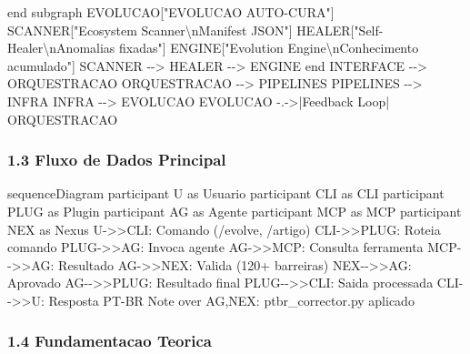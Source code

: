 \documentclass[
  12pt,
]{article}
\newenvironment{Shaded}{}{}
\newcommand{\NormalTok}[1]{#1}
\begin{document}
\begin{Shaded}
\begin{Highlighting}[]
\NormalTok{end}
\NormalTok{subgraph EVOLUCAO["EVOLUCAO AUTO{-}CURA"]}
\NormalTok{SCANNER["Ecosystem Scanner\textbackslash{}nManifest JSON"]}
\NormalTok{HEALER["Self{-}Healer\textbackslash{}nAnomalias fixadas"]}
\NormalTok{ENGINE["Evolution Engine\textbackslash{}nConhecimento acumulado"]}
\NormalTok{SCANNER {-}{-}\textgreater{} HEALER {-}{-}\textgreater{} ENGINE}
\NormalTok{end}
\NormalTok{INTERFACE {-}{-}\textgreater{} ORQUESTRACAO}
\NormalTok{ORQUESTRACAO {-}{-}\textgreater{} PIPELINES}
\NormalTok{PIPELINES {-}{-}\textgreater{} INFRA}
\NormalTok{INFRA {-}{-}\textgreater{} EVOLUCAO}
\NormalTok{EVOLUCAO {-}.{-}\textgreater{}|Feedback Loop| ORQUESTRACAO}
\end{Highlighting}
\end{Shaded}

\subsubsection{1.3 Fluxo de Dados
Principal}\label{fluxo-de-dados-principal}

\begin{Shaded}
\begin{Highlighting}[]
\NormalTok{sequenceDiagram}
\NormalTok{participant U as Usuario}
\NormalTok{participant CLI as CLI}
\NormalTok{participant PLUG as Plugin}
\NormalTok{participant AG as Agente}
\NormalTok{participant MCP as MCP}
\NormalTok{participant NEX as Nexus}
\NormalTok{U{-}\textgreater{}\textgreater{}CLI: Comando (/evolve, /artigo)}
\NormalTok{CLI{-}\textgreater{}\textgreater{}PLUG: Roteia comando}
\NormalTok{PLUG{-}\textgreater{}\textgreater{}AG: Invoca agente}
\NormalTok{AG{-}\textgreater{}\textgreater{}MCP: Consulta ferramenta}
\NormalTok{MCP{-}{-}\textgreater{}\textgreater{}AG: Resultado}
\NormalTok{AG{-}\textgreater{}\textgreater{}NEX: Valida (120+ barreiras)}
\NormalTok{NEX{-}{-}\textgreater{}\textgreater{}AG: Aprovado}
\NormalTok{AG{-}{-}\textgreater{}\textgreater{}PLUG: Resultado final}
\NormalTok{PLUG{-}{-}\textgreater{}\textgreater{}CLI: Saida processada}
\NormalTok{CLI{-}{-}\textgreater{}\textgreater{}U: Resposta PT{-}BR}
\NormalTok{Note over AG,NEX: ptbr\_corrector.py aplicado}
\end{Highlighting}
\end{Shaded}

\subsubsection{1.4 Fundamentacao Teorica}\label{fundamentacao-teorica}
\end{document}
